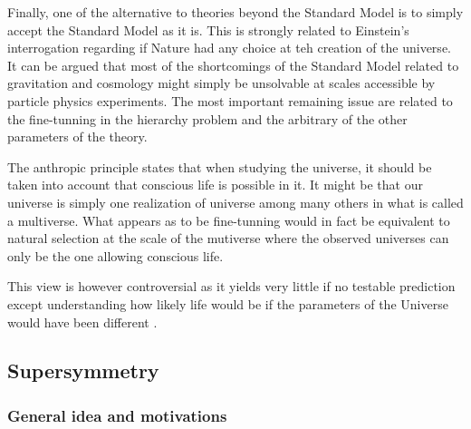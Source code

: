         Finally, one of the alternative to theories beyond the Standard Model is to
        simply accept the Standard Model as it is. This is strongly related to Einstein's
        interrogation regarding if Nature had any choice at teh creation of the universe.
        It can be argued that most of the shortcomings of the Standard Model related to
        gravitation and cosmology might simply be unsolvable at scales accessible by
        particle physics experiments. The most important remaining issue are related to the
        fine-tunning in the hierarchy problem and the arbitrary of the other parameters of
        the theory.

        The anthropic principle states that when studying the universe, it
        should be taken into account that conscious life is possible in it. It might be
        that our universe is simply one realization of universe among many others in what
        is called a multiverse. What appears as to be fine-tunning would in fact be
        equivalent to natural selection at the scale of the mutiverse where the observed
        universes can only be the one allowing conscious life.

        This view is however controversial as it yields very little if no testable
        prediction except understanding how likely life would be if the parameters of
        the Universe would have been different .

        \subsection{Supersymmetry}

        \subsubsection{General idea and motivations}

